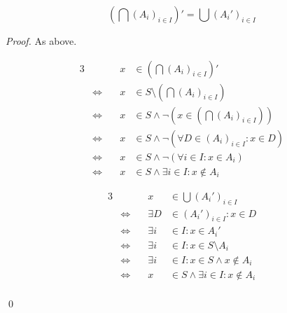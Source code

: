 \documentclass[11pt]{llncs}
\begin{document}
\begin{lemma}
  \[
    \left(\bigcap (A_i)_{i \in I}\right)' = \bigcup \left(A_i'\right)_{i \in I}
  \]
\end{lemma}
\begin{proof}
  As above.

  \begin{minipage}[t]{0.49\textwidth}
    \begin{alignat*}{3}
                           && x &\in \left(\bigcap (A_i)_{i \in I}\right)'\\
      &\Leftrightarrow\quad & x &\in S \setminus \left(\bigcap (A_i)_{i \in I}\right)\\
      &\Leftrightarrow\quad & x &\in S \land \lnot \left(x \in \left(\bigcap (A_i)_{i \in I}\right)\right)\\
      &\Leftrightarrow\quad & x &\in S \land \lnot (\forall D \in (A_i)_{i \in I}: x \in D)\\
      &\Leftrightarrow\quad & x &\in S \land \lnot (\forall i \in I: x \in A_i)\\
      &\Leftrightarrow\quad & x &\in S \land \exists i \in I: x \not\in A_i
    \end{alignat*}
  \end{minipage}
  \textwidth
  \vline
  \textwidth
  \begin{minipage}[t]{0.49\textwidth}
    \begin{alignat*}{3}
                           && x &\in \bigcup \left(A_i'\right)_{i \in I}\\
      &\Leftrightarrow\quad & \exists D &\in (A_i')_{i \in I}: x \in D\\
      &\Leftrightarrow\quad & \exists i &\in I: x \in A_i'\\
      &\Leftrightarrow\quad & \exists i &\in I: x \in S \setminus A_i\\
      &\Leftrightarrow\quad & \exists i &\in I: x \in S \land x \not\in A_i\\
      &\Leftrightarrow\quad & x &\in S \land \exists i \in I: x \not\in A_i\\
    \end{alignat*}
  \end{minipage}
  \qed
\end{proof}
\end{document}
